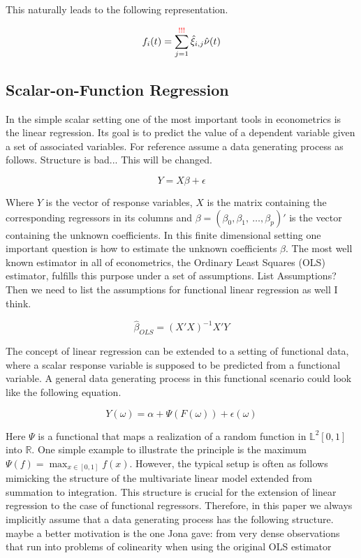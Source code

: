 \documentclass[11pt,twoside,a4paper]{article}
\begin{document}
	This naturally leads to the following representation.
	
	\begin{equation}
		f_i(t) = \sum_{j = 1}^{{\color{red} !!!}} \hat{\xi}_{i,j} \hat{\nu}(t)
	\end{equation}
	
	\subsection{Scalar-on-Function Regression}
	In the simple scalar setting one of the most important tools in econometrics is the linear regression. Its goal is to predict the value of a dependent variable given a set of associated variables. For reference assume a data generating process as follows. {\color{red} Structure is bad... This will be changed.}
	
	\begin{equation}
		Y = X\beta + \epsilon
	\end{equation}
	
	Where $Y$ is the vector of response variables, $X$ is the matrix containing the corresponding regressors in its columns and $\beta = (\beta_0, \beta_1, \: \dots, \beta_p)'$ is the vector containing the unknown coefficients.
	In this finite dimensional setting one important question is how to estimate the unknown coefficients $\beta$. The most well known estimator in all of econometrics, the Ordinary Least Squares (OLS) estimator, fulfills this purpose under a set of assumptions. {\color{red}List Assumptions? Then we need to list the assumptions for functional linear regression as well I think.}
	
	\begin{equation}
		\hat{\beta}_{OLS} = (X'X)^{-1}X'Y
	\end{equation}
	
	The concept of linear regression can be extended to a setting of functional data, where a scalar response variable is supposed to be predicted from a functional variable. 
	A general data generating process in this functional scenario could look like the following equation.
	
	\begin{equation}
		Y(\omega) = \alpha + \Psi\left(F(\omega)\right) + \epsilon(\omega)
	\end{equation}
	
	Here $\Psi$ is a functional that maps a realization of a random function in $\mathbb{L}^2[0,1]$ into $\mathbb{R}$. One simple example to illustrate the principle is the maximum $\Psi(f) = \max_{x \in [0,1]}f(x)$.
	However, the typical setup is often as follows mimicking the structure of the multivariate linear model extended from summation to integration. This structure is crucial for the extension of linear regression to the case of functional regressors. Therefore, in this paper we always implicitly assume that a data generating process has the following structure. {\color{red} maybe a better motivation is the one Jona gave: from very dense observations that run into problems of colinearity when using the original OLS estimator}
	
\end{document}
